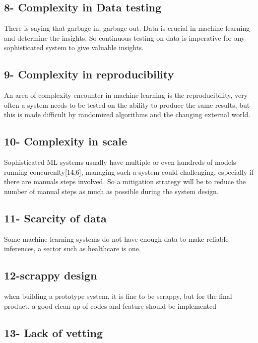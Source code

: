 \documentclass[]{article}
\begin{document}
\subsection{8- Complexity in Data
testing}\label{complexity-in-data-testing}

There is saying that garbage in, garbage out. Data is crucial in machine
learning and determine the insights. So continuous testing on data is
imperative for any sophisticated system to give valuable insights.

\subsection{9- Complexity in
reproducibility}\label{complexity-in-reproducibility}

An area of complexity encounter in machine learning is the
reproducibility, very often a system needs to be tested on the ability
to produce the same results, but this is made difficult by randomized
algorithms and the changing external world.

\subsection{10- Complexity in scale}\label{complexity-in-scale}

Sophisticated ML systems usually have multiple or even hundreds of
models running concurenlty{[}14,6{]}, managing such a system could
challenging, especially if there are manuals steps involved. So a
mitigation strategy will be to reduce the number of manual steps as much
as possible during the system design.

\subsection{11- Scarcity of data}\label{scarcity-of-data}

Some machine learning systems do not have enough data to make reliable
inferences, a sector such as healthcare is one.

\subsection{12-scrappy design}\label{scrappy-design}

when building a prototype system, it is fine to be scrappy, but for the
final product, a good clean up of codes and feature should be
implemented

\subsection{13- Lack of vetting}\label{lack-of-vetting}
\end{document}
